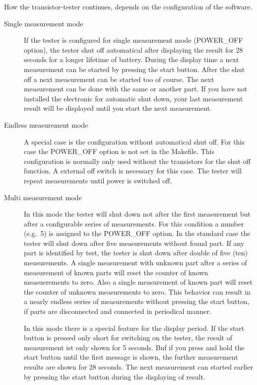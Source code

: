 How the transistor-tester continues, depends on the configuration of the software.
\begin{description}
  \item[Single measurement mode] If the tester is configured for single measurement mode (POWER\_OFF option), the tester shut off automatical 
after displaying the result for 28 seconds for a longer lifetime of battery. 
During the display time a next measurement can be started by pressing the start button.
After the shut off a next measurement can be started too of course.
The next measurement can be done with the same or another part.
If you have not installed the electronic for automatic shut down, your
last measurement result will be displayed until you start the next measurement.

  \item[Endless measurement mode] A special case is the configuration without automatical shut off.
For this case the POWER\_OFF option is not set in the Makefile.
This configuration is normally only used without the transistors for the shut off function.
A external off switch is necessary for this case. The tester will repeat measurements until power
is switched off.

  \item[Multi measurement mode] In this mode the tester will shut down not after the first measurement but 
after a configurable series of measurements.
For this condition a number (e.g.~5) is assigned to the POWER\_OFF option.
In the standard case the tester will shut down after five
measurements without found part. If any part is identified by test, the tester is shut down after double of
five (ten) measurements. A single measurement with unknown part after a series of measurement of known parts will
reset the counter of known measuerements to zero. Also a single measurement of known part will reset the counter
of unknown measurements to zero. This behavior can result in a nearly endless series of measurements without
pressing the start button, if parts are disconnected and connected in periodical manner.

In this mode there is a special feature for the display period. If the start button is pressed only short for switching
on the tester, the result of measurement ist only shown for 5 seconds. Buf if you press and hold the start button until
the first message is shown, the further measurement results are shown for 28 seconds.
The next measurement can started earlier by pressing the start button during the displaying of result.

\end{description}

